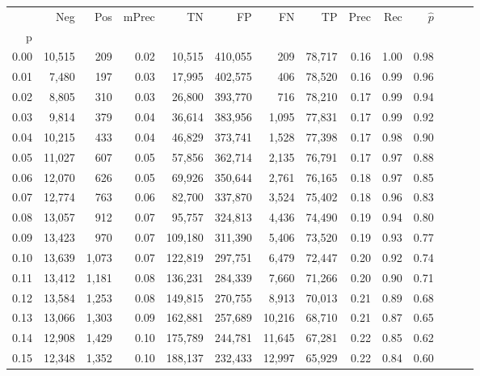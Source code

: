 \begin{tabular}{rrrrrrrrrrrrrr}
\toprule
{} &     Neg &    Pos & mPrec &       TN &       FP &      FN &      TP &  Prec &   Rec & $\hat{p}$ \\
p    &         &        &       &          &          &         &         &       &       &           \\
\midrule
0.00 &  10,515 &    209 &  0.02 &   10,515 &  410,055 &     209 &  78,717 &  0.16 &  1.00 &      0.98 \\
0.01 &   7,480 &    197 &  0.03 &   17,995 &  402,575 &     406 &  78,520 &  0.16 &  0.99 &      0.96 \\
0.02 &   8,805 &    310 &  0.03 &   26,800 &  393,770 &     716 &  78,210 &  0.17 &  0.99 &      0.94 \\
0.03 &   9,814 &    379 &  0.04 &   36,614 &  383,956 &   1,095 &  77,831 &  0.17 &  0.99 &      0.92 \\
0.04 &  10,215 &    433 &  0.04 &   46,829 &  373,741 &   1,528 &  77,398 &  0.17 &  0.98 &      0.90 \\
0.05 &  11,027 &    607 &  0.05 &   57,856 &  362,714 &   2,135 &  76,791 &  0.17 &  0.97 &      0.88 \\
0.06 &  12,070 &    626 &  0.05 &   69,926 &  350,644 &   2,761 &  76,165 &  0.18 &  0.97 &      0.85 \\
0.07 &  12,774 &    763 &  0.06 &   82,700 &  337,870 &   3,524 &  75,402 &  0.18 &  0.96 &      0.83 \\
0.08 &  13,057 &    912 &  0.07 &   95,757 &  324,813 &   4,436 &  74,490 &  0.19 &  0.94 &      0.80 \\
0.09 &  13,423 &    970 &  0.07 &  109,180 &  311,390 &   5,406 &  73,520 &  0.19 &  0.93 &      0.77 \\
0.10 &  13,639 &  1,073 &  0.07 &  122,819 &  297,751 &   6,479 &  72,447 &  0.20 &  0.92 &      0.74 \\
0.11 &  13,412 &  1,181 &  0.08 &  136,231 &  284,339 &   7,660 &  71,266 &  0.20 &  0.90 &      0.71 \\
0.12 &  13,584 &  1,253 &  0.08 &  149,815 &  270,755 &   8,913 &  70,013 &  0.21 &  0.89 &      0.68 \\
0.13 &  13,066 &  1,303 &  0.09 &  162,881 &  257,689 &  10,216 &  68,710 &  0.21 &  0.87 &      0.65 \\
0.14 &  12,908 &  1,429 &  0.10 &  175,789 &  244,781 &  11,645 &  67,281 &  0.22 &  0.85 &      0.62 \\
0.15 &  12,348 &  1,352 &  0.10 &  188,137 &  232,433 &  12,997 &  65,929 &  0.22 &  0.84 &      0.60 \\

\end{tabular}
